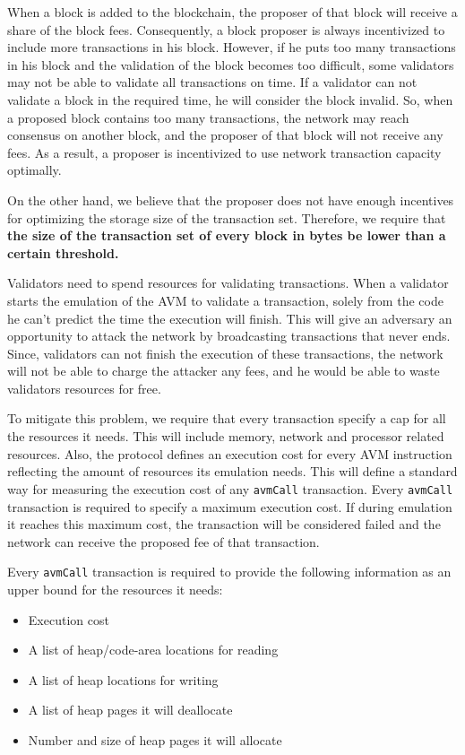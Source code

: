 \documentclass[a4paper]{report}
\begin{document}
    When a block is added to the blockchain, the proposer of that block will receive a share of the block fees.
    Consequently, a block proposer is always incentivized to include more transactions in his block. However, if he
    puts too many transactions in his block and the validation of the block becomes too difficult, some validators
    may not be able to validate all transactions on time. If a validator can not validate a block in the required
    time, he will consider the block invalid. So, when a proposed block contains too many transactions, the network
    may reach consensus on another block, and the proposer of that block will not receive any fees. As a result, a
    proposer is incentivized to use network transaction capacity optimally.

    On the other hand, we believe that the proposer does not have enough incentives for optimizing the storage size
    of the transaction set. Therefore, we require that \textbf{the size of the transaction set of every block in
    bytes be lower than a certain threshold.}

    Validators need to spend resources for validating transactions. When a validator starts the emulation of the AVM
    to validate a transaction, solely from the code he can't predict the time the execution will finish. This will
    give an adversary an opportunity to attack the network by broadcasting transactions that never ends. Since,
    validators can not finish the execution of these transactions, the network will not be able to charge the
    attacker any fees, and he would be able to waste validators resources for free.

    To mitigate this problem, we require that every transaction specify a cap for all the resources it needs. This
    will include memory, network and processor related resources. Also, the protocol defines an execution cost for
    every AVM instruction reflecting the amount of resources its emulation needs. This will define a standard way for
    measuring the execution cost of any \texttt{avmCall} transaction. Every \texttt{avmCall} transaction is required
    to specify a maximum execution cost. If during emulation it reaches this maximum cost, the transaction will be
    considered failed and the network can receive the proposed fee of that transaction.

    Every \texttt{avmCall} transaction is required to provide the following information as an upper bound for the
    resources it needs:

    \begin{itemize}
        \item Execution cost
        \item A list of heap/code-area locations for reading
        \item A list of heap locations for writing
        \item A list of heap pages it will deallocate
        \item Number and size of heap pages it will allocate
    \end{itemize}
\end{document}
